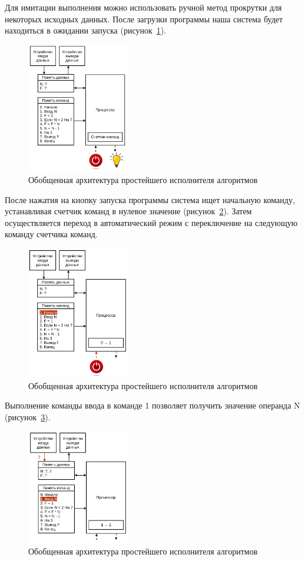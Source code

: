 Для имитации выполнения можно использовать ручной метод прокрутки для некоторых исходных данных. После загрузки программы наша система будет находиться в ожидании запуска (рисунок~\ref{type-02}).
\begin{figure}[htbp]
    \centering
    \includegraphics[width=0.4\textwidth]{img/type-02.png}
    \caption{Обобщенная архитектура простейшего исполнителя алгоритмов}
    \label{type-02}
\end{figure}
После нажатия на кнопку запуска программы система ищет начальную команду, устанавливая счетчик команд в нулевое значение (рисунок~\ref{type-03}). Затем осуществляется переход в автоматический режим с переключение на следующую команду счетчика команд.
\begin{figure}[htbp]
    \centering
    \includegraphics[width=0.4\textwidth]{img/type-03.png}
    \caption{Обобщенная архитектура простейшего исполнителя алгоритмов}
    \label{type-03}
\end{figure}
Выполнение команды ввода в команде 1 позволяет получить значение операнда N (рисунок~\ref{type-04}).
\begin{figure}[htbp]
    \centering
    \includegraphics[width=0.4\textwidth]{img/type-04.png}
    \caption{Обобщенная архитектура простейшего исполнителя алгоритмов}
    \label{type-04}
\end{figure}

